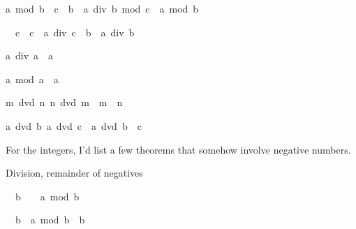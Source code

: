 \begin{isabellebody}
\begin{isamarkuptext}
\begin{isabelle}%
a\ mod\ {\isacharparenleft}b\ {\isacharasterisk}\ c{\isacharparenright}\ {\isacharequal}\ b\ {\isacharasterisk}\ {\isacharparenleft}a\ div\ b\ mod\ c{\isacharparenright}\ {\isacharplus}\ a\ mod\ b%
\end{isabelle}

\begin{isabelle}%
{}\ {\isacharless}\ c\ {\isasymLongrightarrow}\ c\ {\isacharasterisk}\ a\ div\ {\isacharparenleft}c\ {\isacharasterisk}\ b{\isacharparenright}\ {\isacharequal}\ a\ div\ b%
\end{isabelle}

\begin{isabelle}%
a\ div\ {\isacharparenleft}{}{\isasymColon}{\isacharprime}a{\isacharparenright}\ {\isacharequal}\ {\isacharparenleft}{}{\isasymColon}{\isacharprime}a{\isacharparenright}%
\end{isabelle}

\begin{isabelle}%
a\ mod\ {\isacharparenleft}{}{\isasymColon}{\isacharprime}a{\isacharparenright}\ {\isacharequal}\ a%
\end{isabelle}

\begin{isabelle}%
{\isasymlbrakk}m\ dvd\ n{\isacharsemicolon}\ n\ dvd\ m{\isasymrbrakk}\ {\isasymLongrightarrow}\ m\ {\isacharequal}\ n%
\end{isabelle}

\begin{isabelle}%
{\isasymlbrakk}a\ dvd\ b{\isacharsemicolon}\ a\ dvd\ c{\isasymrbrakk}\ {\isasymLongrightarrow}\ a\ dvd\ b\ {\isacharplus}\ c%
\end{isabelle}

For the integers, I'd list a few theorems that somehow involve negative 
numbers.%
\end{isamarkuptext}%
\isamarkuptrue%
%
\begin{isamarkuptext}%
Division, remainder of negatives


\begin{isabelle}%
{}\ {\isacharless}\ b\ {\isasymLongrightarrow}\ {}\ {\isasymle}\ a\ mod\ b%
\end{isabelle}

\begin{isabelle}%
{}\ {\isacharless}\ b\ {\isasymLongrightarrow}\ a\ mod\ b\ {\isacharless}\ b%
\end{isabelle}


\end{isamarkuptext}
\end{isabellebody}
